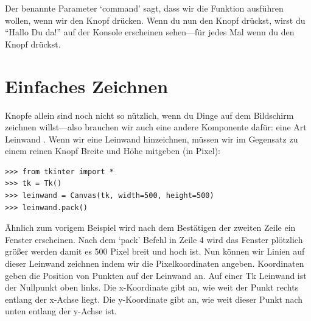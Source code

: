 Der benannte Parameter `command' sagt, dass wir die  Funktion ausführen wollen, wenn wir den Knopf drücken. Wenn du nun den Knopf drückst, wirst du ``Hallo Du da!'' auf der Konsole erscheinen sehen---für jedes Mal wenn du den Knopf drückst. 

\section{Einfaches Zeichnen}

Knopfe allein sind noch nicht so nützlich, wenn du Dinge auf dem Bildschirm zeichnen willst---also brauchen wir auch eine andere Komponente dafür: eine Art Leinwand . Wenn wir eine Leinwand hinzeichnen, müssen wir im Gegensatz zu einem reinen Knopf Breite und Höhe mitgeben (in Pixel):

\begin{Verbatim}[frame=single]
>>> from tkinter import *
>>> tk = Tk()
>>> leinwand = Canvas(tk, width=500, height=500)
>>> leinwand.pack()
\end{Verbatim}

Ähnlich zum vorigem Beispiel wird nach dem Bestätigen der zweiten Zeile ein Fenster erscheinen. Nach dem `pack' Befehl in Zeile 4 wird das Fenster plötzlich größer werden damit es 500 Pixel breit und hoch ist. Nun können wir Linien auf dieser Leinwand zeichnen indem wir die Pixelkoordinaten angeben. Koordinaten geben die Position von Punkten auf der Leinwand an. Auf einer Tk Leinwand ist der Nullpunkt oben links. Die x-Koordinate gibt an, wie weit der Punkt rechts entlang der x-Achse liegt. Die y-Koordinate gibt an, wie weit dieser Punkt nach unten entlang der y-Achse ist.

